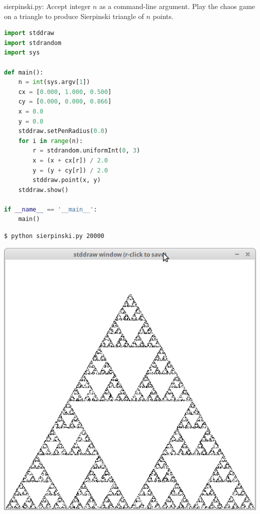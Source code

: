 \documentclass[8pt,a4paper,compress,handout]{beamer}
\begin{document}
\begin{frame}[fragile]
\begin{framed}
\tiny sierpinski.py: Accept integer $n$ as a command-line argument. Play the chaos game on a triangle to produce Sierpinski triangle of $n$ points.
\end{framed}

\begin{lstlisting}[language=Python]
import stddraw
import stdrandom
import sys

def main():
    n = int(sys.argv[1])
    cx = [0.000, 1.000, 0.500]
    cy = [0.000, 0.000, 0.866]
    x = 0.0
    y = 0.0
    stddraw.setPenRadius(0.0)
    for i in range(n):
        r = stdrandom.uniformInt(0, 3)
        x = (x + cx[r]) / 2.0
        y = (y + cy[r]) / 2.0
        stddraw.point(x, y)
    stddraw.show()

if __name__ == '__main__':
    main()
\end{lstlisting}

\begin{minipage}{160pt}
\begin{lstlisting}[language={}]
$ python sierpinski.py 20000
\end{lstlisting}
\end{minipage}%
\begin{minipage}{140pt}
\hfill \includegraphics[scale=0.12]{figures/sierpinski.png}
\end{minipage}
\end{frame}
\end{document}
